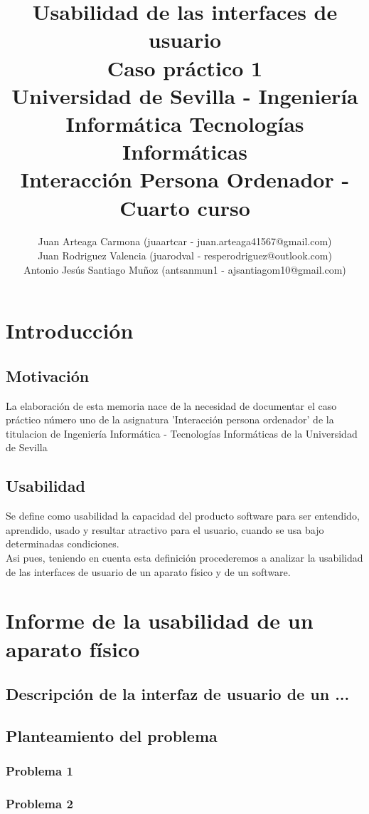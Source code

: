 \documentclass[a4paper,11pt]{article}
\title{
        \textbf{Usabilidad de las interfaces de usuario}\large\\
        \textbf{Caso práctico 1}\\
        \medskip
        Universidad de Sevilla - Ingeniería Informática Tecnologías Informáticas\\
        Interacción Persona Ordenador - Cuarto curso}
\author{Juan Arteaga Carmona (juaartcar - juan.arteaga41567@gmail.com)\\
        Juan Rodriguez Valencia (juarodval - resperodriguez@outlook.com)\\
        Antonio Jesús Santiago Muñoz (antsanmun1 - ajsantiagom10@gmail.com)\\
}
\begin{document}
\maketitle


\newpage
\tableofcontents
\listoffigures
\newpage

\section{Introducción}
\subsection{Motivación}
La elaboración de esta memoria nace de la necesidad de documentar el caso práctico número uno de la asignatura 'Interacción persona ordenador' de la titulacion de Ingeniería Informática - Tecnologías Informáticas de la Universidad de Sevilla
\subsection{Usabilidad}
Se define como usabilidad la capacidad del producto software para ser entendido, aprendido, usado y resultar atractivo para el usuario, cuando se usa bajo determinadas condiciones. \cite{diapTema1} \cite{iso25010}\\
Asi pues, teniendo en cuenta esta definición procederemos a analizar la usabilidad de las interfaces de usuario de un aparato físico y de un software.

\section{Informe de la usabilidad de un aparato físico}
\subsection{Descripción de la interfaz de usuario de un ... }
\subsection{Planteamiento del problema}
\subsubsection{Problema 1}
\subsubsection{Problema 2}
\end{document}
